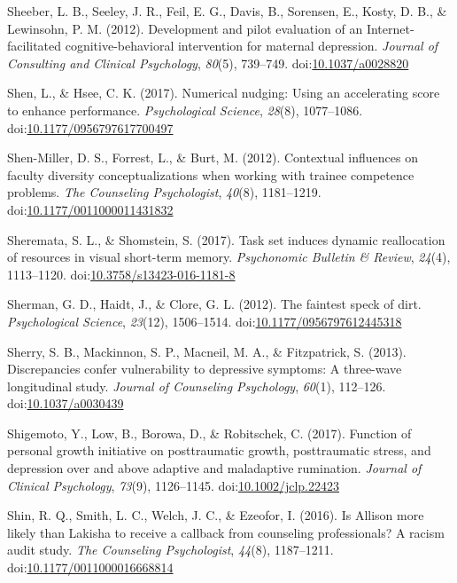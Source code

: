 \documentclass[english,man]{apa6}
\theoremstyle{definition}
\theoremstyle{definition}
\theoremstyle{definition}
\theoremstyle{remark}
\begin{document}
\hypertarget{ref-Sheeber2012}{}
Sheeber, L. B., Seeley, J. R., Feil, E. G., Davis, B., Sorensen, E.,
Kosty, D. B., \& Lewinsohn, P. M. (2012). Development and pilot
evaluation of an Internet-facilitated cognitive-behavioral intervention
for maternal depression. \emph{Journal of Consulting and Clinical
Psychology}, \emph{80}(5), 739--749.
doi:\href{https://doi.org/10.1037/a0028820}{10.1037/a0028820}

\hypertarget{ref-Shen2017}{}
Shen, L., \& Hsee, C. K. (2017). Numerical nudging: Using an
accelerating score to enhance performance. \emph{Psychological Science},
\emph{28}(8), 1077--1086.
doi:\href{https://doi.org/10.1177/0956797617700497}{10.1177/0956797617700497}

\hypertarget{ref-Shen-Miller2012}{}
Shen-Miller, D. S., Forrest, L., \& Burt, M. (2012). Contextual
influences on faculty diversity conceptualizations when working with
trainee competence problems. \emph{The Counseling Psychologist},
\emph{40}(8), 1181--1219.
doi:\href{https://doi.org/10.1177/0011000011431832}{10.1177/0011000011431832}

\hypertarget{ref-Sheremata2016}{}
Sheremata, S. L., \& Shomstein, S. (2017). Task set induces dynamic
reallocation of resources in visual short-term memory. \emph{Psychonomic
Bulletin \& Review}, \emph{24}(4), 1113--1120.
doi:\href{https://doi.org/10.3758/s13423-016-1181-8}{10.3758/s13423-016-1181-8}

\hypertarget{ref-Sherman2012}{}
Sherman, G. D., Haidt, J., \& Clore, G. L. (2012). The faintest speck of
dirt. \emph{Psychological Science}, \emph{23}(12), 1506--1514.
doi:\href{https://doi.org/10.1177/0956797612445318}{10.1177/0956797612445318}

\hypertarget{ref-Sherry2013}{}
Sherry, S. B., Mackinnon, S. P., Macneil, M. A., \& Fitzpatrick, S.
(2013). Discrepancies confer vulnerability to depressive symptoms: A
three-wave longitudinal study. \emph{Journal of Counseling Psychology},
\emph{60}(1), 112--126.
doi:\href{https://doi.org/10.1037/a0030439}{10.1037/a0030439}

\hypertarget{ref-Shigemoto2017}{}
Shigemoto, Y., Low, B., Borowa, D., \& Robitschek, C. (2017). Function
of personal growth initiative on posttraumatic growth, posttraumatic
stress, and depression over and above adaptive and maladaptive
rumination. \emph{Journal of Clinical Psychology}, \emph{73}(9),
1126--1145.
doi:\href{https://doi.org/10.1002/jclp.22423}{10.1002/jclp.22423}

\hypertarget{ref-Shin2016}{}
Shin, R. Q., Smith, L. C., Welch, J. C., \& Ezeofor, I. (2016). Is
Allison more likely than Lakisha to receive a callback from counseling
professionals? A racism audit study. \emph{The Counseling Psychologist},
\emph{44}(8), 1187--1211.
doi:\href{https://doi.org/10.1177/0011000016668814}{10.1177/0011000016668814}
\end{document}
